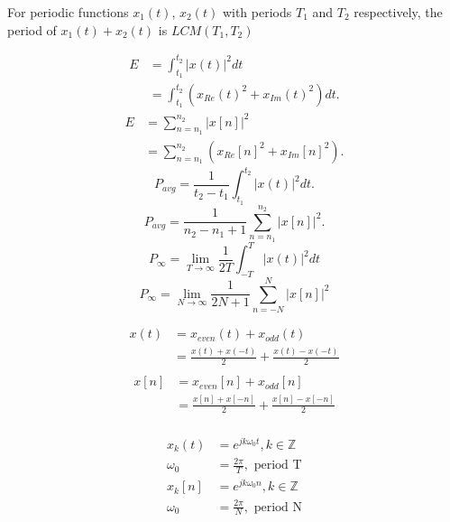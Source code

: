 \documentclass[8pt]{article}
\begin{document}


For periodic functions \(x_1(t)\), \(x_2(t)\) with periods \(T_1\) and
\(T_2\) respectively, the period of \(x_1(t) + x_2(t)\) is \(LCM(T_1, T_2)\)


\begin{align*}
    E & = \int_{t_1}^{t_2} |x(t)|^2 dt                     \\
      & = \int_{t_1}^{t_2} (x_{Re}(t)^2 + x_{Im}(t)^2) dt.
\end{align*}
\begin{align*}
    E & = \sum_{n=n_1}^{n_2} |x[n]|^2                     \\
      & = \sum_{n=n_1}^{n_2} (x_{Re}[n]^2 + x_{Im}[n]^2).
\end{align*}
\begin{equation*}
    P_{avg} = \frac{1}{t_2 - t_1} \int_{t_1}^{t_2} |x(t)|^2 dt.
\end{equation*}
\begin{equation*}
    P_{avg} = \frac{1}{n_2 - n_1 + 1} \sum_{n=n_1}^{n_2} |x[n]|^2.
\end{equation*}
\begin{equation*}
    P_{\infty} = \lim_{T \rightarrow \infty} \frac{1}{2T} \int_{-T}^{T} |x(t)|^2 dt
\end{equation*}
\begin{equation*}
    P_{\infty} = \lim_{N \rightarrow \infty} \frac{1}{2N + 1} \sum_{n=-N}^{N} |x[n]|^2
\end{equation*}

\begin{align*}
    x(t) & = x_{even}(t) + x_{odd}(t)                        \\
         & = \frac{x(t) + x(-t)}{2} + \frac{x(t) - x(-t)}{2} \\
\end{align*}
\begin{align*}
    x[n] & = x_{even}[n] + x_{odd}[n]                        \\
         & = \frac{x[n] + x[-n]}{2} + \frac{x[n] - x[-n]}{2} \\
\end{align*}

\begin{align*}
    x_k(t)   & = e^{jk\omega_0 t}, k \in \mathbb{Z} \\
    \omega_0 & = \frac{2\pi}{T}, \text{ period T}   \\
    x_k[n]   & = e^{jk\omega_0 n}, k \in \mathbb{Z} \\
    \omega_0 & = \frac{2\pi}{N}, \text{ period N}   \\
\end{align*}
\end{document}
